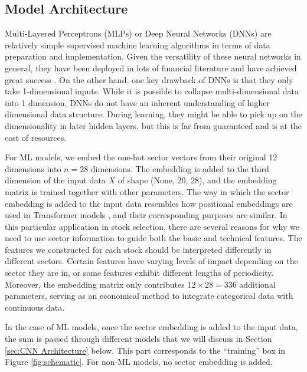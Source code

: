 \documentclass[preprint,12pt,numafflabel,authoryear]{elsarticle}
\begin{document}
\subsection{Model Architecture}
\label{sec:Model Architecture}

Multi-Layered Perceptrons (MLPs) or Deep Neural Networks (DNNs) are relatively simple supervised machine learning algorithms in terms of data preparation and implementation. Given the versatility of these neural networks in general, they have been deployed in lots of financial literature and have achieved great success \citep{gu2020empirical}. On the other hand, one key drawback of DNNs is that they only take 1-dimensional inputs. While it is possible to collapse multi-dimensional data into 1 dimension, DNNs do not have an inherent understanding of higher dimensional data structure. During learning, they might be able to pick up on the dimensionality in later hidden layers, but this is far from guaranteed and is at the cost of resources.

For ML models, we embed the one-hot sector vectors from their original 12 dimensions into $n=28$ dimensions. The embedding is added to the third dimension of the input data $X$ of shape (None, 20, 28), and the embedding matrix is trained together with other parameters. The way in which the sector embedding is added to the input data resembles how positional embeddings are used in Transformer models \citep{vaswani2017attention}, and their corresponding purposes are similar. In this particular application in stock selection, there are several reasons for why we need to use sector information to guide both the basic and technical features. The features we constructed for each stock should be interpreted differently in different sectors. Certain features have varying levels of impact depending on the sector they are in, or some features exhibit different lengths of periodicity. Moreover, the embedding matrix only contributes $12\times 28=336$ additional parameters, serving as an economical method to integrate categorical data with continuous data. 

In the case of ML models, once the sector embedding is added to the input data, the sum is passed through different models that we will discuss in Section \ref{sec:CNN Architecture} below. This part corresponds to the ``training'' box in Figure \ref{fig:schematic}. For non-ML models, no sector embedding is added.
\end{document}
